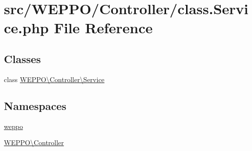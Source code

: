 \hypertarget{class_8Service_8php}{}\section{src/\+W\+E\+P\+P\+O/\+Controller/class.Service.\+php File Reference}
\label{class_8Service_8php}
\subsection*{Classes}
\begin{DoxyCompactItemize}
\item 
class \hyperlink{classWEPPO_1_1Controller_1_1Service}{W\+E\+P\+P\+O\textbackslash{}\+Controller\textbackslash{}\+Service}
\end{DoxyCompactItemize}
\subsection*{Namespaces}
\begin{DoxyCompactItemize}
\item 
 \hyperlink{namespaceweppo}{weppo}
\item 
 \hyperlink{namespaceWEPPO_1_1Controller}{W\+E\+P\+P\+O\textbackslash{}\+Controller}
\end{DoxyCompactItemize}

